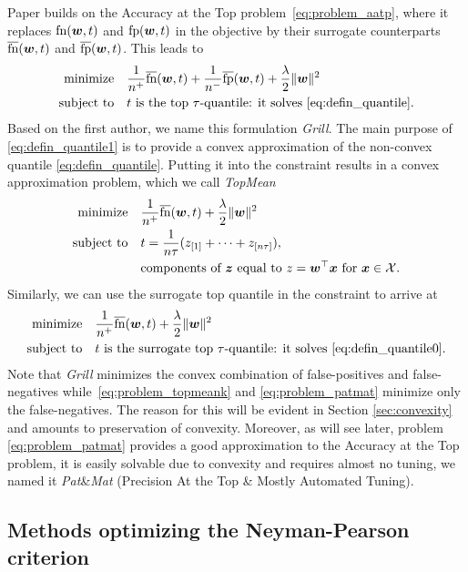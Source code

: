 \documentclass[]{interact}
\theoremstyle{plain}%
\theoremstyle{definition}
\theoremstyle{remark}
\newcommand{\norm}[1]{\|#1\|}
\newcommand{\grill}{\emph{Grill}\xspace}
\newcommand{\patmat}{\emph{Pat}\&\emph{Mat}\xspace}
\newcommand{\topmeank}{\emph{TopMean}\xspace}
\newcommand{\fp}{\textnormal{fp}}
\newcommand{\fn}{\textnormal{fn}}
\newcommand{\fps}{\overline{\textnormal{fp}}}
\newcommand{\fns}{\overline{\textnormal{fn}}}
\newcommand{\Xcal}{\mathcal{X}}
\begin{document}
Paper \cite{Grill_2016} builds on the Accuracy at the Top problem~\eqref{eq:problem_aatp}, where it replaces $\fn(\bm w, t)$ and $\fp(\bm w, t)$ in the objective by their surrogate counterparts $\fns(\bm w, t)$ and $\fps(\bm w, t)$. This leads to
\begin{equation}\label{eq:problem_grill}
\aligned
{\rm minimize} & \quad \frac{1}{n^{+}}\fns(\bm w,t) + \frac{1}{n^{-}}\fps(\bm w,t) + \frac\lambda2\norm{\bm w}^2\\
\textnormal{subject to} & \quad t\text{ is the top \ensuremath{\tau}-quantile: it solves }\eqref{eq:defin_quantile}.
\endaligned
\end{equation}
Based on the first author, we name this formulation \grill. The main purpose of \eqref{eq:defin_quantile1} is to provide a convex approximation of the non-convex quantile \eqref{eq:defin_quantile}. Putting it into the constraint results in a convex approximation problem, which we call \topmeank
\begin{equation}\label{eq:problem_topmeank}
\aligned
{\rm minimize} & \quad\frac{1}{n^{+}}\fns(\bm w,t) + \frac\lambda2\norm{\bm w}^2 \\
\textnormal{subject to} & \quad t = \frac 1{n\tau}(z_{[1]} + \dots + z_{[n\tau]}), \\
& \quad \text{components of }\bm z\text{ equal to }z=\bm w^\top \bm x\text{ for }\bm x \in \Xcal.
\endaligned
\end{equation}
Similarly, we can use the surrogate top quantile in the constraint to arrive at
\begin{equation}\label{eq:problem_patmat}
\aligned
{\rm minimize} & \quad \frac{1}{n^{+}}\fns(\bm w,t) + \frac\lambda2\norm{\bm w}^2\\
\textnormal{subject to} & \quad t\text{ is the surrogate top \ensuremath{\tau}-quantile: it solves }\eqref{eq:defin_quantile0}.
\endaligned
\end{equation}
Note that \grill minimizes the convex combination of false-positives and false-negatives while~\eqref{eq:problem_topmeank} and \eqref{eq:problem_patmat} minimize only the false-negatives. The reason for this will be evident in Section \ref{sec:convexity} and amounts to preservation of convexity. Moreover, as will see later, problem \eqref{eq:problem_patmat} provides a good approximation to the Accuracy at the Top problem, it is easily solvable due to convexity and requires almost no tuning, we named it \patmat{} (Precision At the Top \& Mostly Automated Tuning). 


\subsection{Methods optimizing the Neyman-Pearson criterion}\label{sec:obj3}
\end{document}
